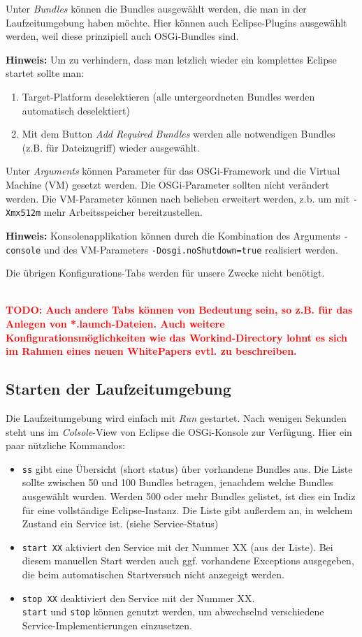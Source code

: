 \documentclass[10pt,a4paper]{scrartcl}
\newcommand{\hinweis}[1]{

\textbf{Hinweis:} #1

}
\newcommand{\review}[1]{
	\hfil\\
	\textbf{\textcolor{red}{#1}}
	\hfil\\
}
\begin{document}
Unter \emph{Bundles} können die Bundles ausgewählt werden, die man in der
Laufzeitumgebung haben möchte. Hier können auch Eclipse-Plugins ausgewählt werden, 
weil diese prinzipiell auch OSGi-Bundles sind. 
\hinweis{Um zu verhindern, dass man letzlich wieder ein komplettes Eclipse startet
sollte man:
\begin{enumerate}
 \item Target-Platform deselektieren (alle untergeordneten Bundles werden automatisch
deselektiert)
 \item Mit dem Button \emph{Add Required Bundles} werden alle notwendigen Bundles (z.B.
für Dateizugriff) wieder ausgewählt.
\end{enumerate}
}

Unter \emph{Arguments} können Parameter für das OSGi-Framework und die Virtual Machine (VM)
gesetzt werden. Die OSGi-Parameter sollten nicht verändert werden. Die VM-Parameter können
nach belieben erweitert werden, z.b. um mit \texttt{-Xmx512m} mehr Arbeitsspeicher bereitzustellen.

\hinweis{Konsolenapplikation können durch die Kombination des Arguments \texttt{-console} und
des VM-Parameters \texttt{-Dosgi.noShutdown=true} realisiert werden.}


Die übrigen Konfigurations-Tabs werden für unsere Zwecke nicht benötigt.

\review{TODO: Auch andere Tabs können von Bedeutung sein, so z.B. für das Anlegen von *.launch-Dateien.
Auch weitere Konfigurationsmöglichkeiten wie das Workind-Directory lohnt es sich im Rahmen
eines neuen WhitePapers evtl. zu beschreiben.}


\subsection{Starten der Laufzeitumgebung}
Die Laufzeitumgebung wird einfach mit \emph{Run} gestartet. Nach wenigen Sekunden steht uns
im \emph{Colsole}-View von Eclipse die OSGi-Konsole zur Verfügung. Hier ein paar nützliche
Kommandos:
\begin{itemize}
 \item \texttt{ss} gibt eine Übersicht (short status) über vorhandene Bundles aus. Die Liste 
sollte zwischen 50 und 100 Bundles betragen, jenachdem welche Bundles ausgewählt wurden. Werden
500 oder mehr Bundles gelistet, ist dies ein Indiz für eine vollständige Eclipse-Instanz.
Die Liste gibt außerdem an, in welchem Zustand ein Service ist. (siehe Service-Status)
 \item \texttt{start XX} aktiviert den Service mit der Nummer XX (aus der Liste). Bei diesem 
manuellen Start werden auch ggf. vorhandene Exceptions ausgegeben, die beim automatischen 
Startversuch nicht anzegeigt werden.
 \item \texttt{stop XX} deaktiviert den Service mit der Nummer XX. \\[0.5cm]\texttt{start} 
und \texttt{stop} können genutzt werden, um abwechselnd verschiedene Service-Implementierungen
einzusetzen.
\end{itemize}
\end{document}
